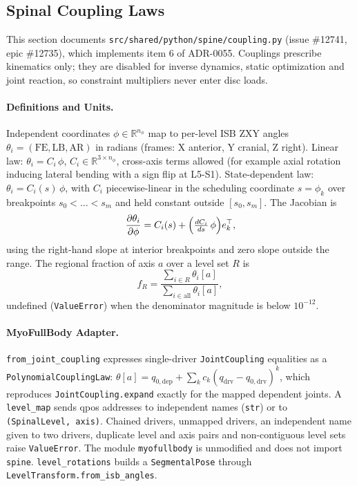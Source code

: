 \subsection{Spinal Coupling Laws}
\label{sec:spn-2a}

This section documents \texttt{src/shared/python/spine/coupling.py} (issue
\#12741, epic \#12735), which implements item 6 of ADR-0055. Couplings
prescribe kinematics only; they are disabled for inverse dynamics, static
optimization and joint reaction, so constraint multipliers never enter disc
loads.

\paragraph{Definitions and Units.}
Independent coordinates $\phi \in \mathbb{R}^{n_\phi}$ map to per-level ISB ZXY
angles $\theta_i = (\mathrm{FE}, \mathrm{LB}, \mathrm{AR})$ in radians
(frames: X anterior, Y cranial, Z right). Linear law:
$\theta_i = C_i\,\phi$, $C_i \in \mathbb{R}^{3\times n_\phi}$, cross-axis terms
allowed (for example axial rotation inducing lateral bending with a sign flip
at L5-S1). State-dependent law: $\theta_i = C_i(s)\,\phi$, with $C_i$
piecewise-linear in the scheduling coordinate $s=\phi_k$ over breakpoints
$s_0<\dots<s_m$ and held constant outside $[s_0,s_m]$. The Jacobian is
\[
  \frac{\partial\theta_i}{\partial\phi} = C_i(s)
  + \Bigl(\tfrac{dC_i}{ds}\,\phi\Bigr)e_k^{\top},
\]
using the right-hand slope at interior breakpoints and zero slope outside the
range. The regional fraction of axis $a$ over a level set $R$ is
\[
  f_R = \frac{\sum_{i\in R}\theta_i[a]}{\sum_{i\in\mathrm{all}}\theta_i[a]},
\]
undefined (\texttt{ValueError}) when the denominator magnitude is below
$10^{-12}$.

\paragraph{MyoFullBody Adapter.}
\texttt{from\_joint\_coupling} expresses single-driver
\texttt{JointCoupling} equalities as a \texttt{PolynomialCouplingLaw}:
$\theta[a] = q_{0,\mathrm{dep}} + \sum_k c_k (q_{\mathrm{drv}}-q_{0,\mathrm{drv}})^k$,
which reproduces \texttt{JointCoupling.expand} exactly for the mapped dependent
joints. A \texttt{level\_map} sends qpos addresses to independent names
(\texttt{str}) or to \texttt{(SpinalLevel, axis)}. Chained drivers, unmapped
drivers, an independent name given to two drivers, duplicate level and axis
pairs and non-contiguous level sets raise \texttt{ValueError}. The module
\texttt{myofullbody} is unmodified and does not import \texttt{spine}.
\texttt{level\_rotations} builds a \texttt{SegmentalPose} through
\texttt{LevelTransform.from\_isb\_angles}.

